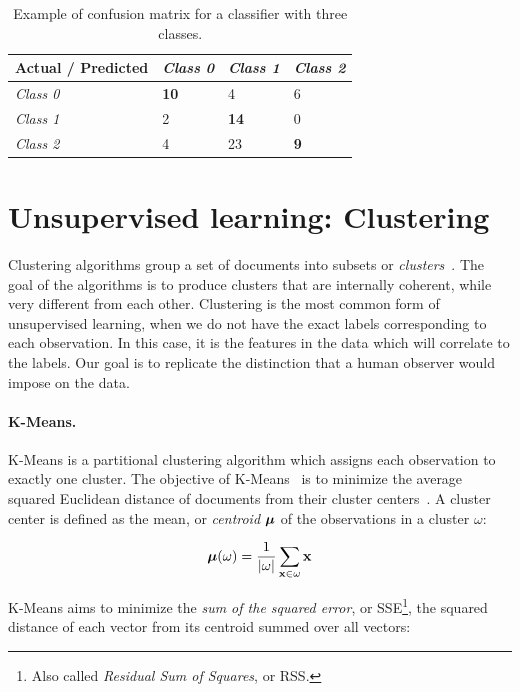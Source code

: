 \begin{table}[]
    \centering
    \begin{tabular}{@{}llll@{}}
    \toprule
    Actual / Predicted & \textit{Class 0} & \textit{Class 1} & \textit{Class 2} \\ \midrule
    \textit{Class 0}   & \textbf{10}      & 4                & 6                \\
    \textit{Class 1}   & 2                & \textbf{14}      & 0                \\
    \textit{Class 2}   & 4                & 23               & \textbf{9}       \\ \bottomrule
    \end{tabular}
    \caption{Example of confusion matrix for a classifier with three classes.}
    \label{tab:background:example-conf-matrix}
    \end{table}

\section{Unsupervised learning: Clustering}

Clustering algorithms group a set of documents into subsets or {\em
clusters}~\cite{manning2010introduction}.
%
The goal of the algorithms is to produce clusters that are internally coherent,
while very different from each other.
%
Clustering is the most common form of unsupervised learning, when we do not have
the exact labels corresponding to each observation. 
%
In this case, it is the features in the data which will correlate to the labels.
%
Our goal is to replicate the distinction that a human observer would impose on
the data.


\paragraph{K-Means.} 
%
K-Means is a partitional clustering algorithm which assigns each observation to
exactly one cluster.
%
The objective of K-Means~\cite{lloyd1982least} is to minimize the average
squared Euclidean distance of documents from their cluster
centers~\cite{manning2010introduction}.
%
A cluster center is defined as the mean, or {\em centroid} $\boldsymbol{\mathbf{\mu}}$ of the
observations in a cluster $\omega$:

$$\boldsymbol{\mathbf{\mu}}(\omega) = \frac{1}{|\omega|} \sum_{\boldsymbol{\mathbf{x}} \in \omega} \boldsymbol{\mathbf{x}}$$

K-Means aims to minimize the {\em sum of the squared error}, or
SSE\footnote{Also called {\em Residual Sum of Squares}, or RSS.}, the squared
distance of each vector from its centroid summed over all vectors:

